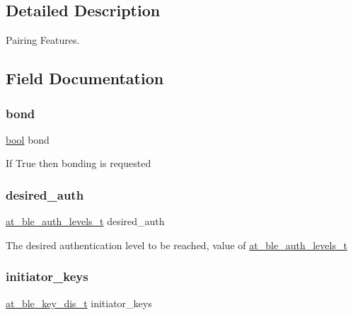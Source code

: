 \subsection{Detailed Description}
Pairing Features. 

\subsection{Field Documentation}
\mbox{\label{structat__ble__pair__features__t_af408fae3fc79712c6c72a088b67c00d7}} 
\subsubsection{\texorpdfstring{bond}{bond}}
{\footnotesize\ttfamily \mbox{\hyperlink{group__group__sam0__utils_ga97a80ca1602ebf2303258971a2c938e2}{bool}} bond}

If True then bonding is requested \mbox{\label{structat__ble__pair__features__t_abf6fc623b510d867745faeebf8845895}} 
\subsubsection{\texorpdfstring{desired\_auth}{desired\_auth}}
{\footnotesize\ttfamily \mbox{\hyperlink{at__ble__api_8h_aeb4d5485cd0d013e0991f8513c628357}{at\+\_\+ble\+\_\+auth\+\_\+levels\+\_\+t}} desired\+\_\+auth}

The desired authentication level to be reached, value of \mbox{\hyperlink{at__ble__api_8h_aeb4d5485cd0d013e0991f8513c628357}{at\+\_\+ble\+\_\+auth\+\_\+levels\+\_\+t}} \mbox{\label{structat__ble__pair__features__t_a5d50a35e7fd63e7011dabaedab0d535e}} 
\subsubsection{\texorpdfstring{initiator\_keys}{initiator\_keys}}
{\footnotesize\ttfamily \mbox{\hyperlink{at__ble__api_8h_a3406daa27ebb020343610744c1e88560}{at\+\_\+ble\+\_\+key\+\_\+dis\+\_\+t}} initiator\+\_\+keys}

